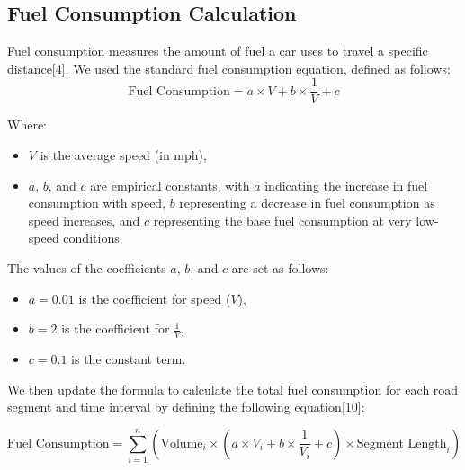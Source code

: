 \subsection{Fuel Consumption Calculation}
Fuel consumption measures the amount of fuel a car uses to travel a specific distance[4]. We used the standard fuel consumption equation, defined as follows:
\begin{equation}
\text{Fuel Consumption} = a \times V + b \times \frac{1}{V} + c
\end{equation}

Where:
\begin{itemize}
    \item \( V \) is the average speed (in mph),
    \item \( a \), \( b \), and \( c \) are empirical constants, with \( a \) indicating the increase in fuel consumption with speed, \( b \) representing a decrease in fuel consumption as speed increases, and \( c \) representing the base fuel consumption at very low-speed conditions.
\end{itemize}

The values of the coefficients \( a \), \( b \), and \( c \) are set as follows:

\begin{itemize}
    \item \( a = 0.01 \) is the coefficient for speed (\( V \)),
    \item \( b = 2 \) is the coefficient for \( \frac{1}{V} \),
    \item \( c = 0.1 \) is the constant term.
\end{itemize}

We then update the formula to calculate the total fuel consumption for each road segment and time interval by defining the following equation[10]:

\begin{equation}
\text{Fuel Consumption} = \sum_{i=1}^{n} \left( \text{Volume}_{i} \times \left( a \times V_{i} + b \times \frac{1}{V_i} + c \right) \times \text{Segment Length}_{i} \right)
\end{equation}

